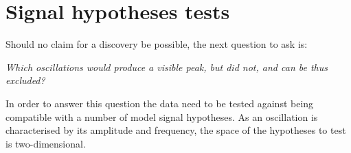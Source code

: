 





\section{Signal hypotheses tests}
\label{sec:signal_hypotheses_tests}
Should no claim for a discovery be possible, the next question to ask is:
\begin{center}
  \emph{Which oscillations would produce a visible peak, but did not, and can be thus excluded?}
\end{center}
In order to answer this question the data need to be tested against being compatible with a number of model signal hypotheses. As an oscillation is characterised by its amplitude and frequency, the space of the hypotheses to test is two-dimensional.

